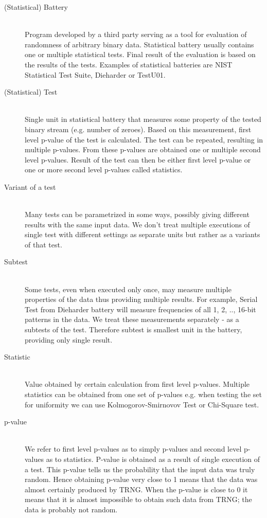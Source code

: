 \documentclass[
  digital,  	%
  color,		%
  oneside,   	%
  12pt,
  nocover,
  notable,
  nolof,
  nolot,
]{fithesis3}
\begin{document}
\begin{description}
\item[(Statistical) Battery] \hfill \\
Program developed by a third party serving as a tool for evaluation of randomness of arbitrary binary data. Statistical battery usually contains one or multiple statistical tests. Final result of the evaluation is based on the results of the tests. Examples of statistical batteries are NIST Statistical Test Suite, Dieharder or TestU01.

\item[(Statistical) Test] \hfill \\
Single unit in statistical battery that measures some property of the tested binary stream (e.g. number of zeroes). Based on this measurement, first level p-value of the test is calculated. The test can be repeated, resulting in multiple p-values. From these p-values are obtained one or multiple second level p-values. Result of the test can then be either first level p-value or one or more second level p-values called statistics.

\item[Variant of a test] \hfill \\
Many tests can be parametrized in some ways, possibly giving different results with the same input data. We don't treat multiple executions of single test with different settings as separate units but rather as a variants of that test.

\item[Subtest] \hfill \\
Some tests, even when executed only once, may measure multiple properties of the data thus providing multiple results. For example, Serial Test from Dieharder battery will measure frequencies of all 1, 2, .., 16-bit patterns in the data. We treat these measurements separately - as a subtests of the test. Therefore subtest is smallest unit in the battery, providing only single result.

\item[Statistic] \hfill \\
Value obtained by certain calculation from first level p-values. Multiple statistics can be obtained from one set of p-values e.g. when testing the set for uniformity we can use Kolmogorov-Smirnovov Test or Chi-Square test.

\item[p-value] \hfill \\
We refer to first level p-values as to simply p-values and second level p-values as to statistics. P-value is obtained as a result of single execution of a test. This p-value tells us the probability that the input data was truly random. Hence obtaining p-value very close to 1 means that the data was almost certainly produced by TRNG. When the p-value is close to 0 it means that it is almost impossible to obtain such data from TRNG; the data is probably not random.
\end{description}
\end{document}
